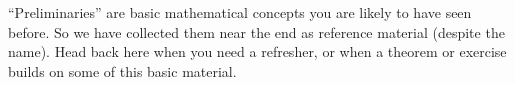 ``Preliminaries'' are basic mathematical concepts you are likely to have seen before.  So we have collected them near the end as reference material (despite the name).  Head back here when you need a refresher, or when a theorem or exercise builds on some of this basic material.